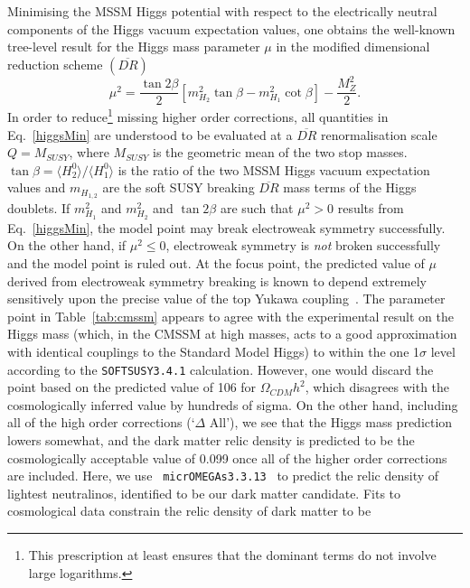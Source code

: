 \documentclass[final,3p,times,pdflatex]{elsarticle}
\begin{document}
Minimising the MSSM Higgs potential with respect to the electrically neutral
components of the Higgs vacuum expectation values, one obtains the well-known
tree-level result for the Higgs mass parameter $\mu$ in the modified
dimensional reduction 
scheme $(\overline{DR})$
\begin{equation}
\mu^2 = 
 \frac{\tan 2\beta}{2} \left[m_{{H}_2}^2\tan \beta
- m_{{H}_1}^2  \cot \beta \right] - \frac{M_Z^2}{2}. \label{higgsMin}
\end{equation}
In order to reduce\footnote{This prescription at least ensures that the
  dominant terms do not involve large logarithms.} missing higher order
corrections, 
all quantities in Eq.~\ref{higgsMin} are understood to be evaluated at a
$\overline{DR}$ renormalisation scale $Q=M_{SUSY}$, where $M_{SUSY}$ is the
geometric mean of the two stop masses.  
$\tan \beta=\langle H_2^0 \rangle / \langle H_1^0 \rangle$ is the ratio of the
two MSSM Higgs vacuum expectation values
 and $m_{{H}_{1,2}}$ are the soft SUSY breaking $\overline{DR}$ mass terms of
 the Higgs doublets.
If $m_{H_1}^2$ and $m_{H_2}^2$ and $\tan 2 \beta$ are such that $\mu^2>0$
results from Eq.~\ref{higgsMin}, the
model point may break electroweak symmetry successfully. On the other hand, if
$\mu^2 \le 0$, electroweak symmetry is {\em not}\/ broken successfully and the
model point is ruled out.
At the focus point,
the predicted value of $\mu$ derived from electroweak symmetry breaking is
known to 
depend extremely sensitively upon the precise value of the top Yukawa
coupling~\cite{Allanach:2000ii}. 
The parameter point in Table~\ref{tab:cmssm}
appears to agree with the experimental result on the Higgs
mass (which, in the CMSSM at high masses, acts to a good approximation with
identical couplings to the Standard Model Higgs)
to within the one 1$\sigma$ level according to the {\tt SOFTSUSY3.4.1}
calculation. However, one would discard the point based on the predicted value
of 106 for $\Omega_{CDM} h^2$, which disagrees with the cosmologically inferred
value by hundreds of sigma. On the other hand, including all of the high order
corrections (`$\Delta$ All'), we see that the Higgs mass prediction lowers
somewhat, and 
the dark matter 
relic density is predicted to be the cosmologically acceptable value of 0.099
once all of the higher order corrections are included.
Here, we use {\tt
  micrOMEGAs3.3.13}~\cite{Belanger:2001fz,Belanger:2004yn,Belanger:2013oya} to 
predict the relic density of 
lightest neutralinos, identified to be our dark matter candidate. 
Fits to cosmological data constrain the relic density of dark matter to be
\end{document}
